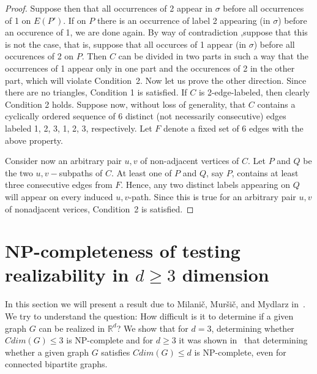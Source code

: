 \documentclass[12pt,a4paper,titlepage,openany]{report}
\begin{document}
\begin{proof}
Suppose then that all occurrences of 2 appear in $\sigma$ before all occurrences of 1 on $E(P')$. If on $P$ there is an occurrence of label 2 appearing (in $\sigma$) before an occurence of 1, we are done again. By way of contradiction  ,suppose that this is not the case, that is, suppose that all occurces of 1 appear (in $\sigma$) before all occurences of 2 on $P$. \newline
Then $C$ can be divided in two parts in such a way that the occurrences of 1 appear only in one part and the occurences of 2 in the other part, which will violate Condition~2.\newline
Now let us prove the other direction. Since there are no triangles, Condition 1 is satisfied. \newline
If $C$ is 2-edge-labeled, then clearly Condition 2 holds.\newline
Suppose now, without loss of generality, that $C$ contains a cyclically ordered sequence of 6 distinct (not necessarily consecutive) edges labeled 1, 2, 3, 1, 2, 3, respectively. Let $F$ denote a fixed set of 6 edges with the above property. 

Consider now an arbitrary pair $u,v$ of non-adjacent vertices of $C$. Let $P$ and $Q$ be the two $u,v-$subpaths of $C$. At least one of $P$ and $Q$, say $P$, contains at least three consecutive edges from $F$. Hence, any two distinct labels appearing on $Q$ will appear on every induced $u,v$-path. Since this is true for an arbitrary pair $u,v$ of nonadjacent verices, Condition~2 is satisfied.\qedhere


\end{proof}

\section{NP-completeness of testing realizability in $d\geq 3$ dimension}
In this section we will present a result due to Milani\v c, Mur\v si\v c, and Mydlarz in~\cite{Milanic}.\newline
We try to understand the question: How difficult is it to determine if a given graph $G$ can be realized in $\mathbb{R}^d$?\newline
We show that for $d=3$, determining whether $Cdim(G)\leq 3$ is NP-complete and for $d\geq 3$ it was shown in~\cite{Milanic} that determining whether a given graph $G$ satisfies $Cdim(G) \leq d$ is NP-complete, even for connected bipartite graphs.
\end{document}
